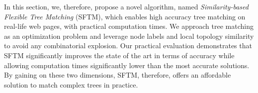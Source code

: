 In this section, we, therefore, propose a novel algorithm, named \emph{Similarity-based Flexible Tree Matching} (SFTM), which enables high accuracy tree matching on real-life web pages, with practical computation times.
We approach tree matching as an optimization problem and leverage node labels and local topology similarity to avoid any combinatorial explosion.
Our practical evaluation demonstrates that SFTM significantly improves the state of the art in terms of accuracy while allowing computation times significantly lower than the most accurate solutions.
By gaining on these two dimensions, SFTM, therefore, offers an affordable solution to match complex trees in practice.


